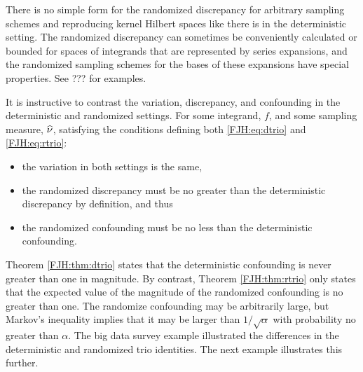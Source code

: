 \documentclass[graybox,footinfo]{svmult}
\begin{document}
There is no simple form for the randomized discrepancy for arbitrary sampling schemes 
and reproducing kernel Hilbert spaces like there is in the deterministic setting.  The 
randomized discrepancy can sometimes be conveniently calculated or bounded for 
spaces of integrands that are represented by series expansions, and the randomized 
sampling schemes for the bases of these expansions have special properties.  See ??? 
for examples.

It is instructive to contrast the variation, discrepancy, and confounding in the 
deterministic and randomized settings.   For some integrand, $f$, and some sampling 
measure, $\widehat{\nu}$, satisfying the 
conditions defining both \eqref{FJH:eq:dtrio}  and \eqref{FJH:eq:rtrio}:
\begin{itemize}
	\item the variation in both settings is the same,
	
	\item the randomized discrepancy 
	must be no greater than the deterministic discrepancy by definition, and thus
	
	\item the randomized confounding must be no less than the deterministic 
	confounding.  
\end{itemize}
Theorem \ref{FJH:thm:dtrio} states that the deterministic confounding is never greater 
than one in magnitude.  By contrast, Theorem \ref{FJH:thm:rtrio} 
only states that the expected value of the magnitude of the randomized confounding is 
no greater than one.  The randomize confounding may be arbitrarily large, but Markov's 
inequality implies that it may be larger than $1/\sqrt{\alpha}$ with  probability no greater 
than $\alpha$.  The big data survey example illustrated the differences in the 
deterministic and randomized trio identities.  The next example illustrates this further.
\end{document}
